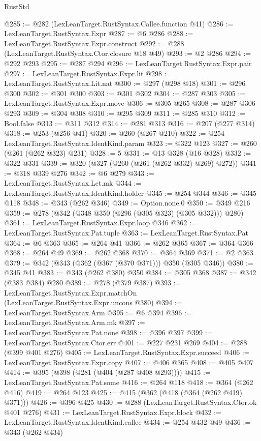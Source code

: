 \begin{lexlean}{RustStd}
\begin{coremodule}
{\begin{coremodule}
{{{{{{{@285 := @282 (LexLeanTarget.RustSyntax.Callee.function @41)
@286 := LexLeanTarget.RustSyntax.Expr
@287 := @6 @286
@288 := LexLeanTarget.RustSyntax.Expr.construct
@292 := @288 (LexLeanTarget.RustSyntax.Ctor.closure @18 @49)
@293 := @2 @286
@294 := @292 @293
@295 := @287 @294
@296 := LexLeanTarget.RustSyntax.Expr.pair
@297 := LexLeanTarget.RustSyntax.Expr.lit
@298 := LexLeanTarget.RustSyntax.Lit.nat
@300 := @297 (@298 @18)
@301 := @296 @300
@302 := @301 @300
@303 := @301 @302
@304 := @287 @303
@305 := LexLeanTarget.RustSyntax.Expr.move
@306 := @305 @265
@308 := @287 @306 @293
@309 := @304 @308
@310 := @295 @309
@311 := @285 @310
@312 := Bool.false
@313 := @311 @312
@314 := @281 @313
@316 := @207 (@277 @314)
@318 := @253 (@256 @41)
@320 := @260 (@267 @210)
@322 := @254 LexLeanTarget.RustSyntax.IdentKind.param
@323 := @322 @123
@327 := @260 (@261 (@262 @323) @231)
@328 := 5
@331 := @13 @328 (@16 @328)
@332 := @322 @331
@339 := @320 (@327 (@260 (@261 (@262 @332) @269) @272))
@341 := @318 @339 @276
@342 := @6 @279
@343 := LexLeanTarget.RustSyntax.Let.mk
@344 := LexLeanTarget.RustSyntax.IdentKind.holder
@345 := @254 @344
@346 := @345 @118
@348 := @343 (@262 @346)
@349 := Option.none.{0}
@350 := @349 @216
@359 := @278 (@342 (@348 @350 (@296 (@305 @323) (@305 @332))) @280)
@361 := LexLeanTarget.RustSyntax.Expr.loop @346
@362 := LexLeanTarget.RustSyntax.Pat.tuple
@363 := LexLeanTarget.RustSyntax.Pat
@364 := @6 @363
@365 := @264 @41
@366 := @262 @365
@367 := @364 @366
@368 := @264 @49
@369 := @262 @368
@370 := @364 @369
@371 := @2 @363
@379 := @342 (@343 (@362 (@367 (@370 @371))) @350 (@305 @346))
@380 := @345 @41
@383 := @343 (@262 @380) @350
@384 := @305 @368
@387 := @342 (@383 @384) @280
@389 := @278 (@379 @387)
@393 := LexLeanTarget.RustSyntax.Expr.matchOn (LexLeanTarget.RustSyntax.Expr.uncons @380)
@394 := LexLeanTarget.RustSyntax.Arm
@395 := @6 @394
@396 := LexLeanTarget.RustSyntax.Arm.mk
@397 := LexLeanTarget.RustSyntax.Pat.none
@398 := @396 @397
@399 := LexLeanTarget.RustSyntax.Ctor.err
@401 := @227 @231 @269
@404 := @288 (@399 @401 @276)
@405 := LexLeanTarget.RustSyntax.Expr.succeed
@406 := LexLeanTarget.RustSyntax.Expr.copy
@407 := @406 @365
@408 := @405 @407
@414 := @395 (@398 (@281 (@404 (@287 @408 @293))))
@415 := LexLeanTarget.RustSyntax.Pat.some
@416 := @264 @118
@418 := @364 (@262 @416)
@419 := @264 @123
@425 := @415 (@362 (@418 (@364 (@262 @419) @371)))
@426 := @396 @425
@430 := @288 (LexLeanTarget.RustSyntax.Ctor.ok @401 @276)
@431 := LexLeanTarget.RustSyntax.Expr.block
@432 := LexLeanTarget.RustSyntax.IdentKind.callee
@434 := @254 @432 @49
@436 := @343 (@262 @434)
}}}}}}}
\end{coremodule}}
\end{coremodule}
\end{lexlean}
